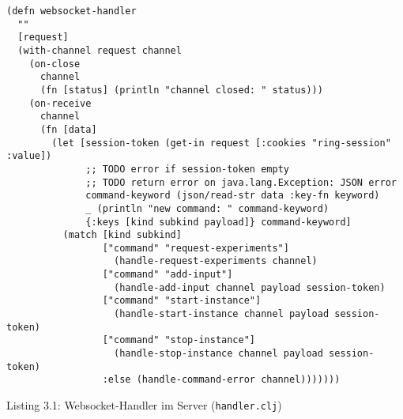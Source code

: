 \clearpage
\begin{verbatim}
(defn websocket-handler
  ""
  [request]
  (with-channel request channel
    (on-close
      channel
      (fn [status] (println "channel closed: " status)))
    (on-receive
      channel
      (fn [data]
        (let [session-token (get-in request [:cookies "ring-session" :value])
              ;; TODO error if session-token empty
              ;; TODO return error on java.lang.Exception: JSON error
              command-keyword (json/read-str data :key-fn keyword)
              _ (println "new command: " command-keyword)
              {:keys [kind subkind payload]} command-keyword]
          (match [kind subkind]
                 ["command" "request-experiments"]
                   (handle-request-experiments channel)
                 ["command" "add-input"]
                   (handle-add-input channel payload session-token)
                 ["command" "start-instance"]
                   (handle-start-instance channel payload session-token)
                 ["command" "stop-instance"]
                   (handle-stop-instance channel payload session-token)
                 :else (handle-command-error channel)))))))
\end{verbatim}
\begin{center}
  Listing 3.1: Websocket-Handler im Server (\texttt{handler.clj})
\end{center}
\clearpage


